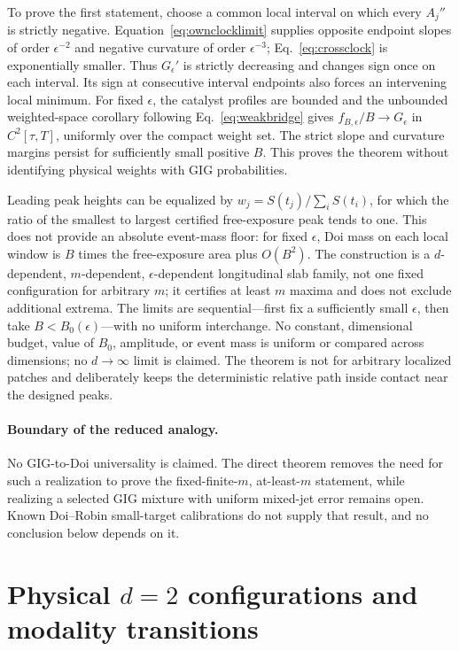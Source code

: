 \documentclass[aps,physrev,reprint,amsmath,amssymb,longbibliography,floatfix]{revtex4-2}
\begin{document}
To prove the first statement, choose a common local interval on which every
$A_j''$ is strictly negative.  Equation~\eqref{eq:ownclocklimit} supplies
opposite endpoint slopes of order $\epsilon^{-2}$ and negative curvature of
order $\epsilon^{-3}$; Eq.~\eqref{eq:crossclock} is exponentially smaller.
Thus $G_\epsilon'$ is strictly decreasing and changes sign once on each
interval.  Its sign at consecutive interval endpoints also forces an
intervening local minimum.  For fixed $\epsilon$, the catalyst profiles are
bounded and the unbounded weighted-space corollary following
Eq.~\eqref{eq:weakbridge} gives
$f_{B,\epsilon}/B\to G_\epsilon$ in $C^2[\tau,T]$, uniformly over the compact
weight set.  The strict slope and curvature margins persist for sufficiently
small positive $B$.  This proves the theorem without identifying physical
weights with GIG probabilities.

Leading peak heights can be equalized by
$w_j=S(t_j)/\sum_iS(t_i)$, for which the ratio of the smallest to largest
certified free-exposure peak tends to one.  This does not provide an absolute
event-mass floor: for fixed $\epsilon$, Doi mass on each local window is
$B$ times the free-exposure area plus $O(B^2)$.  The construction is a
$d$-dependent, $m$-dependent, $\epsilon$-dependent longitudinal slab family,
not one fixed configuration for arbitrary $m$; it certifies at least $m$
maxima and does not
exclude additional extrema.  The limits are sequential---first fix a
sufficiently small $\epsilon$, then take $B<B_0(\epsilon)$---with no uniform
interchange.  No constant, dimensional budget, value of $B_0$, amplitude, or
event mass is uniform or compared across dimensions; no $d\to\infty$ limit is
claimed.  The theorem is not for arbitrary localized patches and deliberately
keeps the deterministic relative path
inside contact near the designed peaks.

\paragraph{Boundary of the reduced analogy.}
No GIG-to-Doi universality is claimed.  The direct theorem removes the need
for such a realization to prove the fixed-finite-$m$, at-least-$m$ statement, while
realizing a selected GIG mixture with uniform mixed-jet error remains open.
Known Doi--Robin small-target calibrations \cite{isaacsonMauroNewby2016uniform}
do not supply that result, and no conclusion below depends on it.

\section{Physical $d=2$ configurations and modality transitions}
\label{sec:numerics}
\end{document}
